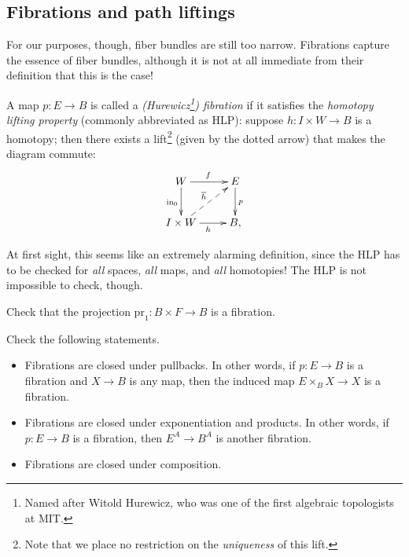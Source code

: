 \subsection{Fibrations and path liftings}
For our purposes, though, fiber bundles are still too narrow.
Fibrations capture the essence of fiber bundles, although it is not at all immediate from their definition that this is the case!
\begin{definition}\label{fibration}
    A map $p:E\to B$ is called a \emph{(Hurewicz\footnote{Named after Witold Hurewicz, who was one of the first algebraic
    topologists at MIT.}) fibration} if it satisfies the
    \emph{homotopy lifting property} (commonly abbreviated as HLP):
    suppose $h:I\times W\to B$ is a homotopy; then there exists a lift\footnote{Note that we place no restriction on the
    \emph{uniqueness} of this lift.}
    (given by the dotted arrow) that makes the diagram commute:
    \begin{equation}\label{hlp}
	\xymatrix{
	    W\ar[r]^f\ar[d]_{\mathrm{in}_0} & E\ar[d]^p\\
	    I\times W\ar[r]_h\ar@{-->}[ur]^{\overline{h}} & B,
	    }
    \end{equation}
\end{definition}
At first sight, this seems like an extremely alarming definition, since
the HLP has to be checked for \emph{all} spaces, \emph{all} maps, and \emph{all} homotopies! 
The HLP is not impossible to check, though.

\begin{exercise}\label{productfibration}
    Check that the projection $\mathrm{pr}_1: B\times F\to B$ is a fibration.
\end{exercise}

\begin{exercise}
    Check the following statements.
    \begin{itemize}
	\item Fibrations are closed under pullbacks. In other words, if $p:E\to B$ is a fibration and $X\to B$ is any map, then the induced map $E\times_B X\to X$ is a fibration.
	\item Fibrations are closed under exponentiation and products. In other words, if $p:E\to B$ is a fibration, then $E^A\to B^A$ is another fibration.
	\item Fibrations are closed under composition.
    \end{itemize}
\end{exercise}

